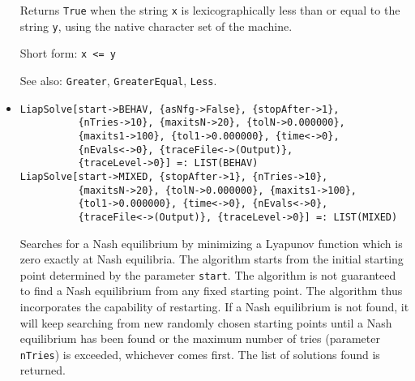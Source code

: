 \begin{itemize}
\bd
Returns \verb+True+ when the string \verb+x+ is lexicographically less than
or equal to the string \verb+y+, using the native character set of the machine.
\item [Short form:] \verb+x <= y+
\item [See also:] \verb+Greater+, \verb+GreaterEqual+, \verb+Less+.
\ed

\item{}
\protect \large \begin{verbatim}
LiapSolve[start->BEHAV, {asNfg->False}, {stopAfter->1}, 
          {nTries->10}, {maxitsN->20}, {tolN->0.000000}, 
          {maxits1->100}, {tol1->0.000000}, {time<->0}, 
          {nEvals<->0}, {traceFile<->(Output)}, 
          {traceLevel->0}] =: LIST(BEHAV) 
LiapSolve[start->MIXED, {stopAfter->1}, {nTries->10}, 
          {maxitsN->20}, {tolN->0.000000}, {maxits1->100}, 
          {tol1->0.000000}, {time<->0}, {nEvals<->0}, 
          {traceFile<->(Output)}, {traceLevel->0}] =: LIST(MIXED) 
\end{verbatim}\normalsize


\bd 
Searches for a Nash equilibrium by minimizing a Lyapunov function
which is zero exactly at Nash equilibria.  The algorithm starts from
the initial starting point determined by the parameter \verb+start+.
The algorithm is not guaranteed to find a Nash equilibrium from any
fixed starting point.  The algorithm thus incorporates the capability
of restarting.  If a Nash equilibrium is not found, it will keep
searching from new randomly chosen starting points until a Nash
equilibrium has been found or the maximum number of tries (parameter
\verb+nTries+) is exceeded, whichever comes first.  The list of
solutions found is returned.


\end{itemize}
